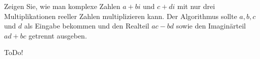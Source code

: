 
\begin{exercise}

Zeigen Sie, wie man komplexe Zahlen $a + bi$ und $c + di$ mit nur drei Multiplikationen reeller Zahlen
multiplizieren kann. Der Algorithmus sollte $a,b,c$ und $d$ als Eingabe bekommen und den Realteil
$ac - bd$ sowie den Imaginärteil $ad + bc$ getrennt ausgeben.

\end{exercise}


\begin{solution}

ToDo!

\end{solution}

